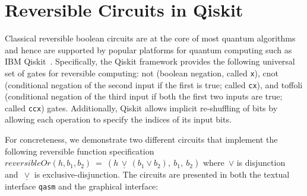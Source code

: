 \section{Reversible Circuits in Qiskit}
\label{sec:qiskit}
\label{sec:examples}

Classical reversible boolean circuits are at the core of most quantum algorithms and hence are supported by popular
platforms for quantum computing such as IBM Qiskit~\cite{aleksandrowiczQiskitOpensourceFramework2019}. Specifically, the
Qiskit framework provides the following universal set of gates for reversible computing: \textsf{not} (boolean negation,
called \verb|x|), \textsf{cnot} (conditional negation of the second input if the first is true; called \verb|cx|), and
\textsf{toffoli} (conditional negation of the third input if both the first two inputs are true; called \verb|ccx|)
gates. Additionally, Qiskit allows implicit re-shuffling of bits by allowing each operation to specify the indices of
its input bits.

For concreteness, we demonstrate two different circuits that implement the
following reversible function specification
$\mathit{reversibleOr}(h,b_1,b_2) ~=~ (h \,\underline{\vee}\, (b_1 \vee b_2),
~b_1, ~b_2)$ where~$\vee$ is disjunction and~$\underline{\vee}$ is exclusive-disjunction. The circuits are presented in both the textual interface
\verb|qasm| and the graphical interface:

